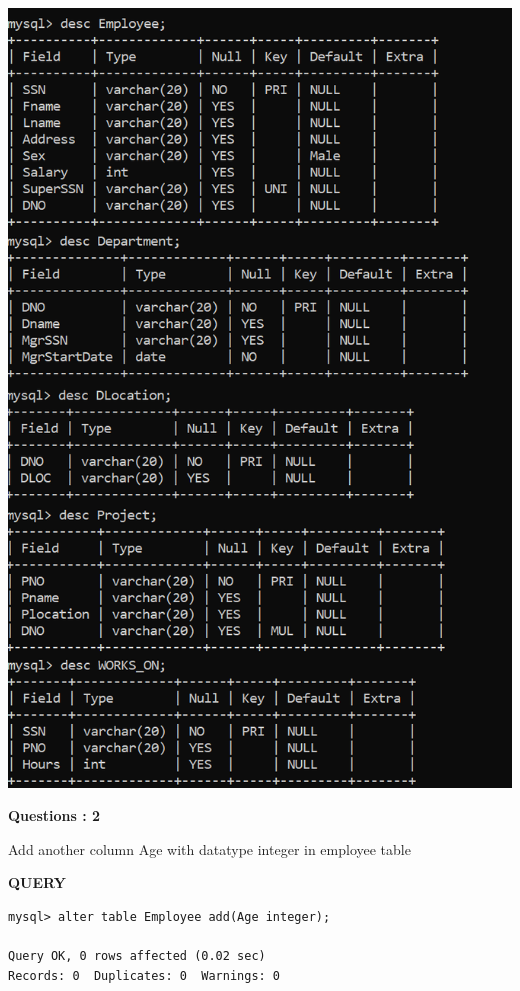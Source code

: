 \documentclass[a4paper,12pt]{report}
\begin{document}
      \includegraphics[scale=1]{createtables.png}
	\newpage
	

\begin{flushleft}
    \textbf{Questions : 2}
\end{flushleft}
Add another column Age with datatype integer in employee table
\begin{flushleft}
		\textbf{QUERY }
	\end{flushleft}
\begin{verbatim}
mysql> alter table Employee add(Age integer);

Query OK, 0 rows affected (0.02 sec)
Records: 0  Duplicates: 0  Warnings: 0

\end{verbatim}
\end{document}
